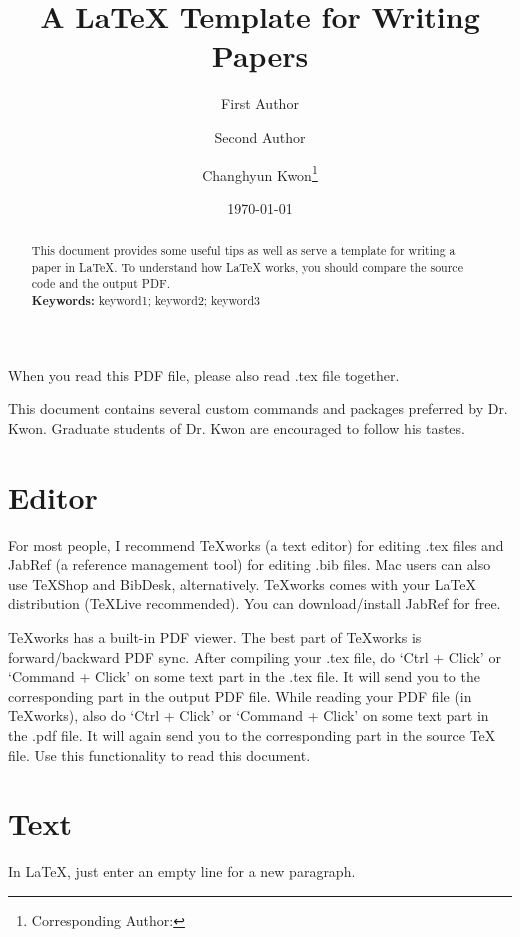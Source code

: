 \documentclass[letterpaper, 11pt]{article}
\title{A LaTeX Template for Writing Papers}
\author[1]{First Author}
\author[2]{Second Author}
\author[3]{Changhyun Kwon\footnote{Corresponding Author: \email{chkwon@usf.edu}}}
\affil[1]{Department of First Engineering, First University}
\affil[2]{Department of Second Engineering, First University}
\affil[3]{Department of Industrial and Management Systems Engineering, University of South Florida}
\date{\today}
\newcommand{\bluenote}[1]{{\Large\color{blue}#1}}
\newcommand{\rednote}[1]{{\Large\color{red}#1}}
\begin{document}
\maketitle

\begin{abstract}
This document provides some useful tips as well as serve a template for writing a paper in LaTeX.
To understand how LaTeX works, you should compare the source code and the output PDF.\\
\noindent\textbf{Keywords:} keyword1; keyword2; keyword3
\end{abstract}



\rednote{When you read this PDF file, please also read .tex file together.}

\bluenote{This document contains several custom commands and packages preferred by Dr. Kwon.
Graduate students of Dr. Kwon are encouraged to follow his tastes.}


\section{Editor} \label{sec:editor}

For most people, I recommend TeXworks (a text editor) for editing .tex files and JabRef (a reference management tool) for editing .bib files.
Mac users can also use TeXShop and BibDesk, alternatively.
TeXworks comes with your LaTeX distribution (TeXLive recommended).
You can download/install JabRef for free.

TeXworks has a built-in PDF viewer.
The best part of TeXworks is forward/backward PDF sync.
After compiling your .tex file, do `Ctrl + Click' or `Command + Click' on some text part in the .tex file.
It will send you to the corresponding part in the output PDF file.
While reading your PDF file (in TeXworks), also do `Ctrl + Click' or `Command + Click' on some text part in the .pdf file.
It will again send you to the corresponding part in the source TeX file.
Use this functionality to read this document.











\section{Text} \label{sec:paragraph}
In LaTeX, just enter an empty line for a new paragraph.
\end{document}
